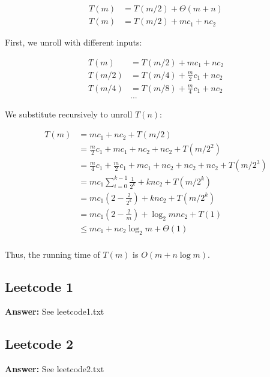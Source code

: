 \documentclass[]{book}
\theoremstyle{definition}
\begin{document}
\begin{enumerate}[label=\alph*.]

            \begin{align*}
                T(m) &= T(m/2) + \Theta(m + n) \\
                T(m) &= T(m/2) + mc_1 + nc_2
            \end{align*}

            First, we unroll with different inputs:
        
            \begin{align*}
                T(m)   &= T(m/2) + mc_1 + nc_2 \\
                T(m/2) &= T(m/4) + \frac{m}{2}c_1 + nc_2 \\
                T(m/4) &= T(m/8) + \frac{m}{4}c_1 + nc_2 \\
                        &...
            \end{align*}

        We substitute recursively to unroll $T(n)$:

        \begin{align*}
          T(m) &= mc_1 + nc_2 + T(m/2)\\
               &= \frac{m}{2}c_1 + mc_1 + nc_2 + nc_2 + T(m/2^2)\\
               &= \frac{m}{4}c_1 + \frac{m}{2}c_1 + mc_1 + nc_2 + nc_2 + nc_2 + T(m/2^3)\\
               &= mc_1 \sum_{i=0}^{k-1} \frac{1}{2^k} + k nc_2 + T(m/2^k) \\
               &= mc_1 (2 - \frac{2}{2^k}) + k nc_2 + T(m/2^k) \\
               &= mc_1 (2 - \frac{2}{m}) + \log_2 m nc_2 + T(1) \\
               &\leq mc_1 + nc_2 \log_2 m + \Theta(1) \\
        \end{align*}

        Thus, the running time of $T(m)$ is $O(m + n \log m)$.
            
\end{enumerate}


\subsection*{Leetcode 1}

    \textbf{Answer:} See leetcode1.txt

\subsection*{Leetcode 2}

    \textbf{Answer:} See leetcode2.txt
\end{document}
